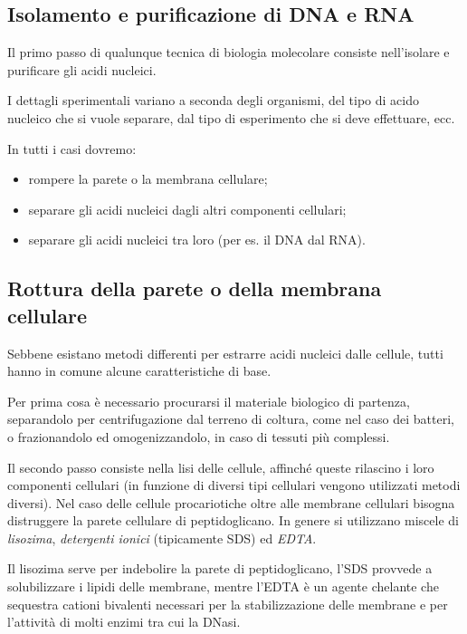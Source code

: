 \documentclass[11pt]{book}
\begin{document}
\subsection{Isolamento e purificazione di DNA e
RNA}\label{isolamento-e-purificazione-di-dna-e-rna}

Il primo passo di qualunque tecnica di biologia molecolare consiste
nell'isolare e purificare gli acidi nucleici.

I dettagli sperimentali variano a seconda degli organismi, del tipo di
acido nucleico che si vuole separare, dal tipo di esperimento che si
deve effettuare, ecc.

In tutti i casi dovremo:

\begin{itemize}
\itemsep1pt\parskip0pt
\item
  rompere la parete o la membrana cellulare;
\item
  separare gli acidi nucleici dagli altri componenti cellulari;
\item
  separare gli acidi nucleici tra loro (per es. il DNA dal RNA).
\end{itemize}

\subsection{Rottura della parete o della membrana
cellulare}\label{rottura-della-parete-o-della-membrana-cellulare}

Sebbene esistano metodi differenti per estrarre acidi nucleici dalle
cellule, tutti hanno in comune alcune caratteristiche di base.

Per prima cosa è necessario procurarsi il materiale biologico di
partenza, separandolo per centrifugazione dal terreno di coltura, come
nel caso dei batteri, o frazionandolo ed omogenizzandolo, in caso di
tessuti più complessi.

Il secondo passo consiste nella lisi delle cellule, affinché queste
rilascino i loro componenti cellulari (in funzione di diversi tipi
cellulari vengono utilizzati metodi diversi). Nel caso delle cellule
procariotiche oltre alle membrane cellulari bisogna distruggere la
parete cellulare di peptidoglicano. In genere si utilizzano miscele di
\emph{lisozima}, \emph{detergenti ionici} (tipicamente SDS) ed
\emph{EDTA}.

Il lisozima serve per indebolire la parete di peptidoglicano, l'SDS
provvede a solubilizzare i lipidi delle membrane, mentre l'EDTA è un
agente chelante che sequestra cationi bivalenti necessari per la
stabilizzazione delle membrane e per l'attività di molti enzimi tra cui
la DNasi.
\end{document}
